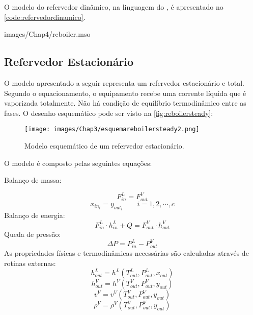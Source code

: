 O modelo do refervedor dinâmico, na linguagem do \emso, é apresentado no
\autoref{code:refervedordinamico}.

 {images/Chap4/reboiler.mso}

\subsection{Refervedor Estacionário} \label{sec:modelorefervedorestacionario}
O modelo apresentado a seguir representa um refervedor estacionário e total. Segundo o equacionamento, o equipamento
recebe uma corrente líquida que é vaporizada totalmente. Não há condição de equilíbrio termodinâmico entre as fases. O
desenho esquemático pode ser visto na \autoref{fig:reboilersteady}:
\begin{figure}[htb]
\centering \texttt{[image: images/Chap3/esquemareboilersteady2.png]}
\caption{Modelo esquemático de um refervedor estacionário.}
\label{fig:reboilersteady}
\end{figure}

O modelo é composto pelas seguintes equações:

\begin{flushleft}
Balanço de massa:
\end{flushleft}
\begin{equation}
F_{in}^L = F_{out}^V
\end{equation}
\begin{equation}
x_{in_i} = y_{out_i} \qquad i=1,2,\cdots,c
\end{equation}
Balanço de energia:
\begin{equation}
F_{in}^L \cdot h_{in}^L + Q= F_{out}^V \cdot h_{out}^V 
\end{equation}
Queda de pressão:
\begin{equation}
\Delta P = P_{in}^L - P_{out}^V
\end{equation}
As propriedades físicas e termodinâmicas necessárias são calculadas através de rotinas externas:
\begin{equation}
h_{out}^L = h^L(T_{out}^L, P_{out}^L, x_{out})
\end{equation}
\begin{equation}
h_{out}^V = h^V(T_{out}^V, P_{out}^V, y_{out})
\end{equation}
\begin{equation}
v^V = v^V(T_{out}^V, P_{out}^V, y_{out})
\end{equation}
\begin{equation}
\rho^V = \rho^V(T_{out}^V, P_{out}^V, y_{out})
\end{equation}

